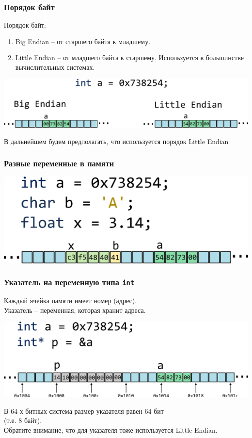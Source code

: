\documentclass[10pt,pdf,hyperref={unicode}]{beamer}
\begin{document}
\begin{frame}[fragile]
\frametitle{Порядок байт}
Порядок байт:
\begin{enumerate}
\item Big Endian -- от старшего байта к младшему.
\item Little Endian  -- от младшего байта к старшему. Используется в большинстве вычислительных системах.
\end{enumerate}
\begin{center}
\includegraphics[width=0.86\linewidth]{../images/memory/memory_1_endianness.png}
\end{center}
В дальнейшем будем предполагать, что используется порядок Little Endian
\end{frame}

\begin{frame}[fragile]
\frametitle{Разные переменные в памяти} 
\begin{center}
\includegraphics[width=0.86\linewidth]{../images/memory/memory_2_different_types.png}
\end{center}
\end{frame}

\begin{frame}[fragile]
\frametitle{Указатель на переменную типа \texttt{int}}
Каждый ячейка памяти имеет номер (адрес).\\
Указатель -- переменная, которая хранит адреса.
\begin{center}
\includegraphics[width=0.86\linewidth]{../images/memory/memory_3_pointer_to_int.png}
\end{center}
В 64-х битных система размер указателя равен 64 бит \\(т.е. 8 байт).\\
Обратите внимание, что для указателя тоже используется Little Endian.
\end{frame}
\end{document}
